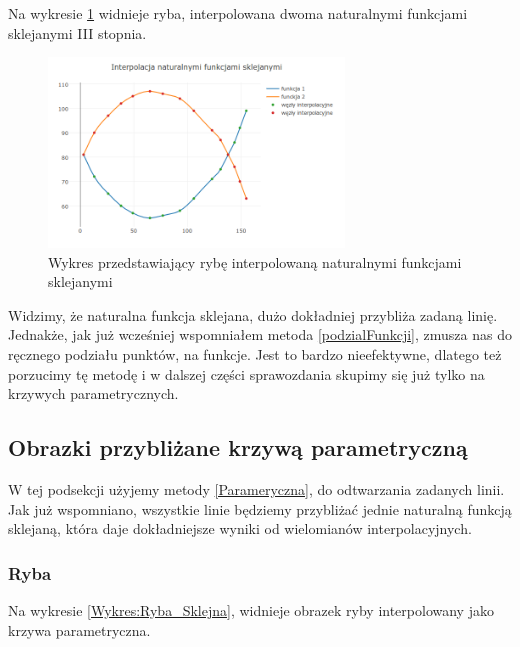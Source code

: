 \documentclass{article}
\begin{document}
	Na wykresie \ref{Wykres:Ryba_Sklejane} widnieje ryba, interpolowana dwoma naturalnymi funkcjami sklejanymi III stopnia.
	
		\begin{figure}[h]
			\centering
			\includegraphics[width=0.7\textwidth]{newplot(1).png}
			\caption{Wykres przedstawiający rybę interpolowaną naturalnymi funkcjami sklejanymi}
			\label{Wykres:Ryba_Sklejane}
		\end{figure}
	
	Widzimy, że naturalna funkcja sklejana, dużo dokładniej przybliża zadaną linię. 
	Jednakże, jak już wcześniej wspomniałem metoda \ref{podzialFunkcji}, zmusza nas do ręcznego podziału punktów, na funkcje. Jest to bardzo nieefektywne, dlatego też porzucimy tę metodę i w dalszej części sprawozdania skupimy się już tylko na krzywych parametrycznych.
	
	
\subsection{Obrazki przybliżane krzywą parametryczną}
	
	W tej podsekcji użyjemy metody \ref{Parameryczna}, do odtwarzania zadanych linii.
	Jak już wspomniano, wszystkie linie będziemy przybliżać jednie naturalną funkcją sklejaną, która daje dokładniejsze wyniki od wielomianów interpolacyjnych.
	
	
	\subsubsection{Ryba}
	
	Na wykresie \ref{Wykres:Ryba_Sklejna}, widnieje obrazek ryby interpolowany jako krzywa parametryczna.
	
\end{document}
